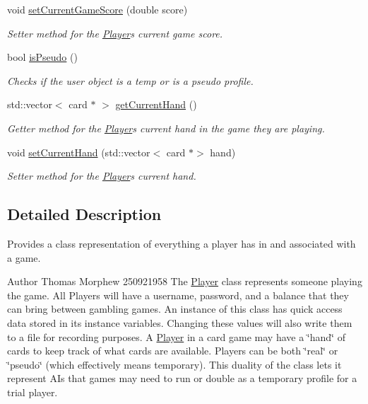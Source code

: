 \begin{DoxyCompactItemize}
void \mbox{\hyperlink{class_player_a1b2af56d4beb6e7a7961b3b572b42bdb}{set\+Current\+Game\+Score}} (double score)
\begin{DoxyCompactList}\small\item\em Setter method for the \mbox{\hyperlink{class_player}{Player}}\textquotesingle{}s current game score. \end{DoxyCompactList}\item 
bool \mbox{\hyperlink{class_player_a50aa73eae22ec3435d3de2e556bd1fec}{is\+Pseudo}} ()
\begin{DoxyCompactList}\small\item\em Checks if the user object is a temp or is a pseudo profile. \end{DoxyCompactList}\item 
std\+::vector$<$ card $\ast$ $>$ \mbox{\hyperlink{class_player_a5117d4863ff28cd0bf522cfe34995c27}{get\+Current\+Hand}} ()
\begin{DoxyCompactList}\small\item\em Getter method for the \mbox{\hyperlink{class_player}{Player}}\textquotesingle{}s current hand in the game they are playing. \end{DoxyCompactList}\item 
void \mbox{\hyperlink{class_player_a8a4e0a62953bad66dd6dd18f28619ead}{set\+Current\+Hand}} (std\+::vector$<$ card $\ast$$>$ hand)
\begin{DoxyCompactList}\small\item\em Setter method for the \mbox{\hyperlink{class_player}{Player}}\textquotesingle{}s current hand. \end{DoxyCompactList}\end{DoxyCompactItemize}


\subsection{Detailed Description}
Provides a class representation of everything a player has in and associated with a game. 

\begin{DoxyAuthor}{Author}
Thomas Morphew 250921958 The \mbox{\hyperlink{class_player}{Player}} class represents someone playing the game. All Players will have a username, password, and a balance that they can bring between gambling games. An instance of this class has quick access data stored in its instance variables. Changing these values will also write them to a file for recording purposes. A \mbox{\hyperlink{class_player}{Player}} in a card game may have a \char`\"{}hand\char`\"{} of cards to keep track of what cards are available. Players can be both \char`\"{}real\char`\"{} or \char`\"{}pseudo\char`\"{} (which effectively means temporary). This duality of the class lets it represent AI\textquotesingle{}s that games may need to run or double as a temporary profile for a trial player. 
\end{DoxyAuthor}


